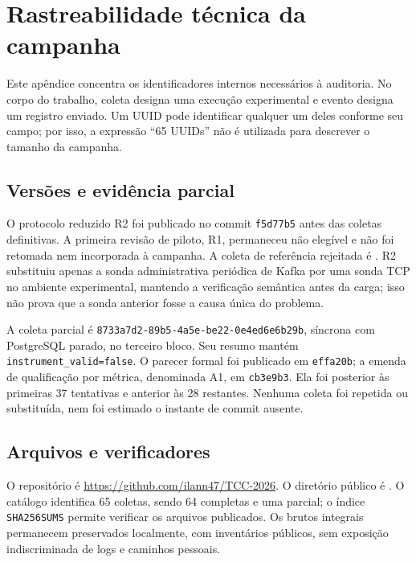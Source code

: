 \chapter{Rastreabilidade técnica da campanha}
\label{ap:rastreabilidade}

Este apêndice concentra os identificadores internos necessários à auditoria. No corpo do trabalho, coleta designa uma execução experimental e evento designa um registro enviado. Um UUID pode identificar qualquer um deles conforme seu campo; por isso, a expressão ``65 UUIDs'' não é utilizada para descrever o tamanho da campanha.

\section{Versões e evidência parcial}
O protocolo reduzido R2 foi publicado no commit \texttt{f5d77b5} antes das coletas definitivas. A primeira revisão de piloto, R1, permaneceu não elegível e não foi retomada nem incorporada à campanha. A coleta de referência rejeitada é . R2 substituiu apenas a sonda administrativa periódica de Kafka por uma sonda TCP no ambiente experimental, mantendo a verificação semântica antes da carga; isso não prova que a sonda anterior fosse a causa única do problema.

A coleta parcial é \texttt{8733a7d2-89b5-4a5e-be22-0e4ed6e6b29b}, síncrona com PostgreSQL parado, no terceiro bloco. Seu resumo mantém \texttt{instrument\_valid=false}. O parecer formal foi publicado em \texttt{effa20b}; a emenda de qualificação por métrica, denominada A1, em \texttt{cb3e9b3}. Ela foi posterior às primeiras 37 tentativas e anterior às 28 restantes. Nenhuma coleta foi repetida ou substituída, nem foi estimado o instante de commit ausente.

\section{Arquivos e verificadores}
O repositório é \url{https://github.com/ilann47/TCC-2026}. O diretório público é . O catálogo identifica 65 coletas, sendo 64 completas e uma parcial; o índice \texttt{SHA256SUMS} permite verificar os arquivos publicados. Os brutos integrais permanecem preservados localmente, com inventários públicos, sem exposição indiscriminada de logs e caminhos pessoais.

